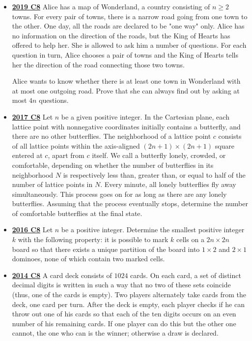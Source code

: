 \documentclass[11pt]{scrartcl}
\begin{document}
\begin{itemize}[leftmargin=*]
Determine the number of cookies that $A$ receives if both players play optimally.
\newpage
    \item \href{https://artofproblemsolving.com/community/c6h2278997p17828730}{\textbf{2019 C8}} Alice has a map of Wonderland, a country consisting of $n \geqslant  2$ towns. For every pair of towns, there is a narrow road going from one town to the other. One day, all the roads are declared to be "one way" only. Alice has no information on the direction of the roads, but the King of Hearts has offered to help her. She is allowed to ask him a number of questions. For each question in turn, Alice chooses a pair of towns and the King of Hearts tells her the direction of the road connecting those two towns.
    
Alice wants to know whether there is at least one town in Wonderland with at most one outgoing road. Prove that she can always find out by asking at most $4n$ questions.
    \item \href{https://artofproblemsolving.com/community/c6h1671285p10632334}{\textbf{2017 C8}} 	Let $n$ be a given positive integer. In the Cartesian plane, each lattice point with nonnegative coordinates initially contains a butterfly, and there are no other butterflies. The neighborhood of a lattice point $c$ consists of all lattice points within the axis-aligned $(2n+1) \times (2n+1)$ square entered at $c$, apart from $c$ itself. We call a butterfly lonely, crowded, or comfortable, depending on whether the number of butterflies in its neighborhood $N$ is respectively less than, greater than, or equal to half of the number of lattice points in $N$. Every minute, all lonely butterflies fly away simultaneously. This process goes on for as long as there are any lonely butterflies. Assuming that the process eventually stops, determine the number of comfortable butterflies at the final state.
    \item \href{https://artofproblemsolving.com/community/c6h1480704p8639279}{\textbf{2016 C8}} Let $n$ be a positive integer. Determine the smallest positive integer $k$ with the following property: it is possible to mark $k$ cells on a $2n \times 2n$ board so that there exists a unique partition of the board into $1 \times 2$ and $2 \times 1$ dominoes, none of which contain two marked cells.
    \item \href{https://artofproblemsolving.com/community/c6h1113188p5083555}{\textbf{2014 C8}} 	A card deck consists of $1024$ cards. On each card, a set of distinct decimal digits is written in such a way that no two of these sets coincide (thus, one of the cards is empty). Two players alternately take cards from the deck, one card per turn. After the deck is empty, each player checks if he can throw out one of his cards so that each of the ten digits occurs on an even number of his remaining cards. If one player can do this but the other one cannot, the one who can is the winner; otherwise a draw is declared.
    

\end{itemize}
\end{document}

